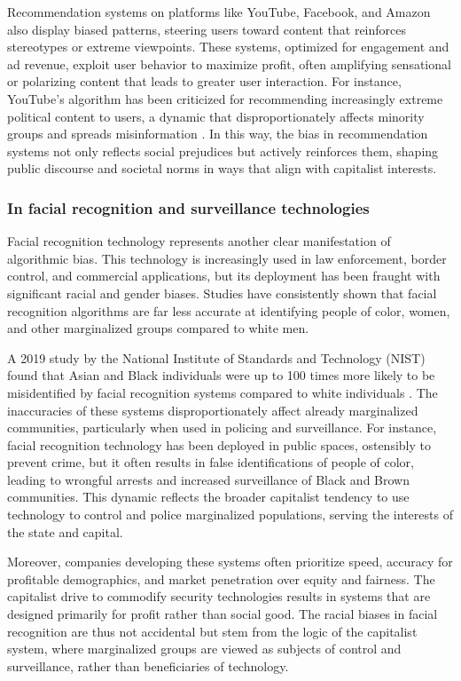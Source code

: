 Recommendation systems on platforms like YouTube, Facebook, and Amazon also display biased patterns, steering users toward content that reinforces stereotypes or extreme viewpoints. These systems, optimized for engagement and ad revenue, exploit user behavior to maximize profit, often amplifying sensational or polarizing content that leads to greater user interaction. For instance, YouTube’s algorithm has been criticized for recommending increasingly extreme political content to users, a dynamic that disproportionately affects minority groups and spreads misinformation \cite[pp.~23-26]{tufekci2018}. In this way, the bias in recommendation systems not only reflects social prejudices but actively reinforces them, shaping public discourse and societal norms in ways that align with capitalist interests.

\subsubsection{In facial recognition and surveillance technologies}

Facial recognition technology represents another clear manifestation of algorithmic bias. This technology is increasingly used in law enforcement, border control, and commercial applications, but its deployment has been fraught with significant racial and gender biases. Studies have consistently shown that facial recognition algorithms are far less accurate at identifying people of color, women, and other marginalized groups compared to white men.

A 2019 study by the National Institute of Standards and Technology (NIST) found that Asian and Black individuals were up to 100 times more likely to be misidentified by facial recognition systems compared to white individuals \cite[pp.~43-45]{grother2019}. The inaccuracies of these systems disproportionately affect already marginalized communities, particularly when used in policing and surveillance. For instance, facial recognition technology has been deployed in public spaces, ostensibly to prevent crime, but it often results in false identifications of people of color, leading to wrongful arrests and increased surveillance of Black and Brown communities. This dynamic reflects the broader capitalist tendency to use technology to control and police marginalized populations, serving the interests of the state and capital.

Moreover, companies developing these systems often prioritize speed, accuracy for profitable demographics, and market penetration over equity and fairness. The capitalist drive to commodify security technologies results in systems that are designed primarily for profit rather than social good. The racial biases in facial recognition are thus not accidental but stem from the logic of the capitalist system, where marginalized groups are viewed as subjects of control and surveillance, rather than beneficiaries of technology.

